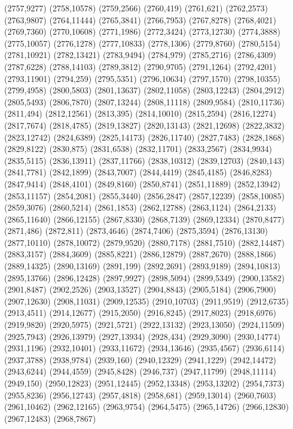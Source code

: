 (2757,9277)
(2758,10578)
(2759,2566)
(2760,419)
(2761,621)
(2762,2573)
(2763,9807)
(2764,11444)
(2765,3841)
(2766,7953)
(2767,8278)
(2768,4021)
(2769,7360)
(2770,10608)
(2771,1986)
(2772,3424)
(2773,12730)
(2774,3888)
(2775,10057)
(2776,1278)
(2777,10833)
(2778,1306)
(2779,8760)
(2780,5154)
(2781,10921)
(2782,13421)
(2783,9494)
(2784,979)
(2785,2716)
(2786,4309)
(2787,6228)
(2788,14103)
(2789,3812)
(2790,9705)
(2791,1264)
(2792,4201)
(2793,11901)
(2794,259)
(2795,5351)
(2796,10634)
(2797,1570)
(2798,10355)
(2799,4958)
(2800,5803)
(2801,13637)
(2802,11058)
(2803,12243)
(2804,2912)
(2805,5493)
(2806,7870)
(2807,13244)
(2808,11118)
(2809,9584)
(2810,11736)
(2811,494)
(2812,12561)
(2813,395)
(2814,10010)
(2815,2594)
(2816,12274)
(2817,7674)
(2818,4785)
(2819,13827)
(2820,13143)
(2821,12698)
(2822,3832)
(2823,12742)
(2824,6389)
(2825,14173)
(2826,11740)
(2827,7483)
(2828,1868)
(2829,8122)
(2830,875)
(2831,6538)
(2832,11701)
(2833,2567)
(2834,9934)
(2835,5115)
(2836,13911)
(2837,11766)
(2838,10312)
(2839,12703)
(2840,143)
(2841,7781)
(2842,1899)
(2843,7007)
(2844,4419)
(2845,4185)
(2846,8283)
(2847,9414)
(2848,4101)
(2849,8160)
(2850,8741)
(2851,11889)
(2852,13942)
(2853,11157)
(2854,2081)
(2855,3440)
(2856,2847)
(2857,12239)
(2858,10085)
(2859,3076)
(2860,5214)
(2861,1853)
(2862,12788)
(2863,1124)
(2864,2133)
(2865,11640)
(2866,12155)
(2867,8330)
(2868,7139)
(2869,12334)
(2870,8477)
(2871,486)
(2872,811)
(2873,4646)
(2874,7406)
(2875,3594)
(2876,13130)
(2877,10110)
(2878,10072)
(2879,9520)
(2880,7178)
(2881,7510)
(2882,14487)
(2883,3157)
(2884,3609)
(2885,8221)
(2886,12879)
(2887,2670)
(2888,1866)
(2889,14325)
(2890,13169)
(2891,199)
(2892,2691)
(2893,9189)
(2894,10813)
(2895,13766)
(2896,12428)
(2897,9927)
(2898,5094)
(2899,5349)
(2900,13582)
(2901,8487)
(2902,2526)
(2903,13527)
(2904,8843)
(2905,5184)
(2906,7900)
(2907,12630)
(2908,11031)
(2909,12535)
(2910,10703)
(2911,9519)
(2912,6735)
(2913,4511)
(2914,12677)
(2915,2050)
(2916,8245)
(2917,8023)
(2918,6976)
(2919,9820)
(2920,5975)
(2921,5721)
(2922,13132)
(2923,13050)
(2924,11509)
(2925,7943)
(2926,13979)
(2927,13934)
(2928,434)
(2929,3090)
(2930,14774)
(2931,1196)
(2932,10401)
(2933,11672)
(2934,13646)
(2935,4567)
(2936,6114)
(2937,3788)
(2938,9784)
(2939,160)
(2940,12329)
(2941,1229)
(2942,14472)
(2943,6244)
(2944,4559)
(2945,8428)
(2946,737)
(2947,11799)
(2948,11114)
(2949,150)
(2950,12823)
(2951,12445)
(2952,13348)
(2953,13202)
(2954,7373)
(2955,8236)
(2956,12743)
(2957,4818)
(2958,681)
(2959,13014)
(2960,7603)
(2961,10462)
(2962,12165)
(2963,9754)
(2964,5475)
(2965,14726)
(2966,12830)
(2967,12483)
(2968,7867)
